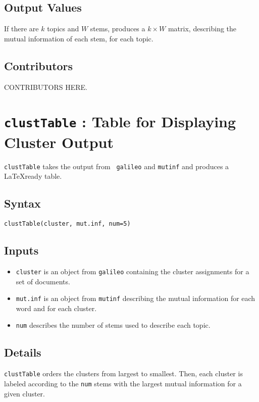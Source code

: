 \documentclass[12pt,letterpaper]{article}
\begin{document}
\subsection*{Output Values} If there are $k$ topics and $W$ stems,
produces a $k \times W$ matrix, describing the mutual information of
each stem, for each topic.

\subsection*{Contributors} CONTRIBUTORS HERE.

\clearpage

\section*{{\tt clustTable} : Table for Displaying Cluster Output}
\label{clustTable} {\tt clustTable} takes the output from {\tt
galileo} and {\tt mutinf} and produces a \LaTeX ready table.

\subsection*{Syntax}
\begin{verbatim}
clustTable(cluster, mut.inf, num=5)
\end{verbatim}
\subsection*{Inputs}
\begin{itemize}
\item{{\tt cluster}} is an object from {\tt galileo} containing the cluster
assignments for a set of documents.
\item{{\tt mut.inf}} is an object from {\tt mutinf} describing the mutual information for each
word and for each cluster.
\item{{\tt num}} describes the number of stems used to describe each
topic.
\end{itemize}

\subsection*{Details} {\tt clustTable} orders the clusters from
largest to smallest. Then, each cluster is labeled according to the
{\tt num} stems with the largest mutual information for a given
cluster.
\end{document}
